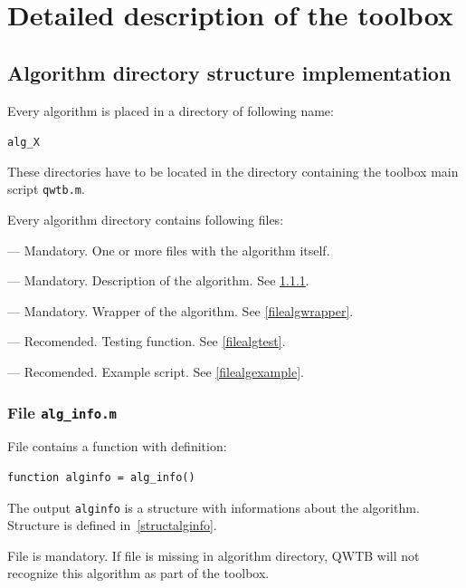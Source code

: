 \documentclass[12pt,a4paper,oneside]{report} %
\begin{document}
\chapter{Detailed description of the toolbox} %
\section{Algorithm directory structure implementation} %
\label{diralg}
Every algorithm is placed in a directory of following name:
\begin{center}
        {\tt alg\_X}
\end{center}
These directories have to be located in the directory containing the toolbox main script {\tt qwtb.m}.

Every algorithm directory contains following files:
\begin{tightdesc}
        \item [{\tt X1}, {\tt X2}, \dots] ---  Mandatory. One or more files with the algorithm itself.
        \item [{\tt alg\_info.m}] ---  Mandatory. Description of the algorithm. See \ref{filealginfo}.
        \item [{\tt alg\_wrapper.m}] ---  Mandatory. Wrapper of the algorithm. See \ref{filealgwrapper}.
        \item [{\tt alg\_test.m}] ---  Recomended. Testing function. See \ref{filealgtest}.
        \item [{\tt alg\_example.m}] ---  Recomended. Example script. See \ref{filealgexample}.
\end{tightdesc}

\subsection{File {\tt alg\_info.m}} %
\label{filealginfo}
File contains a function with definition:

\begin{lstlisting}
function alginfo = alg_info()
\end{lstlisting}

The output \lstinline{alginfo} is a structure with informations about the algorithm. Structure is
defined in~\ref{structalginfo}.

File is mandatory. If file is missing in algorithm directory, QWTB will not recognize this
algorithm as part of the toolbox.
\end{document}
